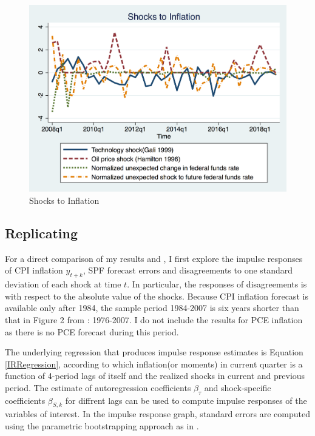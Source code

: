 \documentclass[]{article}
\begin{document}
\begin{figure}[ht]
	\centering
	\includegraphics[width=12cm]{figures/inf_shocksQ.png}
	\caption{ Shocks to Inflation}
	\label{Inflationshocks}
\end{figure}

\subsection{Replicating \citet{coibion2012can}}

For a direct comparison of my results and \citet{coibion2012can}, I first explore the impulse responses of CPI inflation $y_{t+k}$, SPF forecast errors and disagreements to one standard deviation of each shock at time $t$. In particular, the responses of disagreements is with respect to the absolute value of the shocks. Because CPI inflation forecast is available only after 1984, the sample period 1984-2007 is six years shorter than that in Figure 2 from \citet{coibion2012can}: 1976-2007. I do not include the results for PCE inflation as there is no PCE forecast during this period. 

The underlying regression that produces impulse response estimates is  Equation \ref{IRRegression}, according to which inflation(or moments) in current quarter is a function of 4-period lags of itself  and the realized shocks in current and previous period. The estimate of autoregression coefficients $\beta_\tau$ and shock-specific coefficients $\beta_{S,k}$ for diffrent lags can be used to compute impulse responses of the variables of interest. In the impulse response graph, standard errors are computed using the parametric bootstrapping approach as in \citet{coibion2012can}. 
\end{document}
